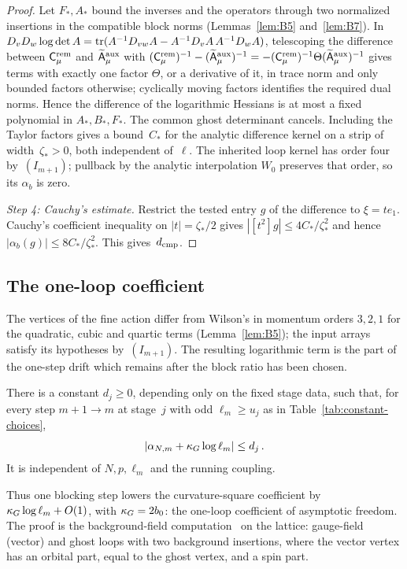 \begin{proof}
Let $F_*,A_*$ bound the inverses and the operators through two normalized insertions in the compatible block norms (Lemmas~\ref{lem:B5} and~\ref{lem:B7}). In $D_vD_w\log\det A=\operatorname{tr}(A^{-1}D_{vw}A-A^{-1}D_vA\,A^{-1}D_wA)$, telescoping the difference between $\mathsf C^{\rm rem}_\mu$ and $\widetilde{\mathsf A}^{\rm aux}_\mu$ with $(\mathsf C^{\rm rem}_\mu)^{-1}-(\widetilde{\mathsf A}^{\rm aux}_\mu)^{-1}=-(\mathsf C^{\rm rem}_\mu)^{-1}\Theta(\widetilde{\mathsf A}^{\rm aux}_\mu)^{-1}$ gives terms with exactly one factor $\Theta$, or a derivative of it, in trace norm and only bounded factors otherwise; cyclically moving factors identifies the required dual norms. Hence the difference of the logarithmic Hessians is at most a fixed polynomial in $A_*,B_*,F_*$. The common ghost determinant cancels. Including the Taylor factors gives a bound~$C_*$ for the analytic difference kernel on a strip of width~$\zeta_*>0$, both independent of~$\ell$. The inherited loop kernel has order four by~$(I_{m+1})$; pullback by the analytic interpolation $W_0$ preserves that order, so its $\alpha_b$ is zero.

\emph{Step 4: Cauchy's estimate.} Restrict the tested entry $g$ of the difference to $\xi=te_1$. Cauchy's coefficient inequality on $|t|=\zeta_*/2$ gives $|[t^2]g|\le4C_*/\zeta_*^2$ and hence $|\alpha_b(g)|\le8C_*/\zeta_*^2$. This gives~$d_{\rm cmp}$.
\end{proof}

\subsection{The one-loop coefficient}\label{subsec:C-coefficient}

The vertices of the fine action differ from Wilson's in momentum orders $3,2,1$ for the quadratic, cubic and quartic terms (Lemma~\ref{lem:B5}); the input arrays satisfy its hypotheses by~$(I_{m+1})$. The resulting logarithmic term is the part of the one-step drift which remains after the block ratio has been chosen.

\begin{lemma}\label{lem:C7}
There is a constant $d_j\ge0$, depending only on the fixed stage data, such that, for every step $m+1\to m$ at stage~$j$ with odd $\ell_m\ge u_j$ as in Table~\ref{tab:constant-choices},
\begin{equation*}
|\alpha_{N,m}+\kappa_G\log\ell_m|\le d_j\,.
\end{equation*}
It is independent of $N,p,\ell_m$ and the running coupling.
\end{lemma}
Thus one blocking step lowers the curvature-square coefficient by $\kappa_G\log\ell_m+O(1)$, with $\kappa_G=2b_0$: the one-loop coefficient of asymptotic freedom. The proof is the background-field computation~\cite{Abbott1982} on the lattice: gauge-field (vector) and ghost loops with two background insertions, where the vector vertex has an orbital part, equal to the ghost vertex, and a spin part.


